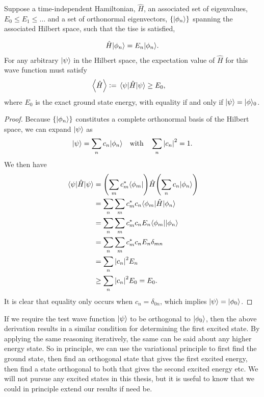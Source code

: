 \documentclass[Thesis.tex]{subfiles}
\begin{document}
\begin{theorem}\label{thm:variational-principle}
    Suppose a time-independent Hamiltonian, $\hat H$, an associated set of eigenvalues,
    $E_0\leq E_1\leq\dots$ and
    a set of orthonormal eigenvectors, $\{| \phi_n \rangle\}$ spanning the associated
    Hilbert space, such that the \gls{tise} is satisfied,

    \begin{align}
        \hat H| \phi_n \rangle = E_n| \phi_n \rangle.
    \end{align}
    For any arbitrary $| \psi \rangle$ in the Hilbert space, the expectation value of $\hat H$
    for this wave function must satisfy
    \begin{align}
        \expval{\hat H}&\vcentcolon= \expval{\hat H}{\psi} \geq E_0,
    \end{align}
    where $E_0$ is the exact ground state energy, with equality if and only if
    $| \psi \rangle=| \phi \rangle_0$.
\end{theorem}
\begin{proof}
    Because $\{| \phi_n \rangle\}$ constitutes a complete orthonormal basis of the Hilbert
    space, we can expand $| \psi \rangle$ as
    \begin{align}
        \ket\psi = \sum_n c_n\ket{\phi_n} \qq{with} \sum_n \abs{c_n}^2 = 1.
    \end{align}
    We then have
    \begin{align}
        \expval{\hat H}{\psi} &= \qty(\sum_m c^*_m\langle \phi_m |)\hat H\qty(\sum_n
        c_n| \phi_n \rangle)\\
        &= \sum_n\sum_m c_m^*c_n\langle \phi_m |\hat H| \phi_n \rangle\\
        &= \sum_n\sum_m c_m^*c_nE_n\langle \phi_m || \phi_n \rangle\\
        &= \sum_n\sum_m c_m^*c_nE_n\delta_{mn}\\
        &= \sum_n \abs{c_n}^2 E_n\\
        &\geq\sum_n \abs{c_n}^2 E_0 = E_0.
    \end{align}
    It is clear that equality only occurs when $c_n = \delta_{0n}$, which implies
    $| \psi \rangle=| \phi_0 \rangle$.
\end{proof}

If we require the test wave function $| \psi \rangle$ to be orthogonal to $| \phi_0 \rangle$, then
the above derivation results in a similar condition for determining the first excited
state. By applying the same reasoning iteratively, the same can be said about any higher
energy state. So in principle, we can use the variational principle to first find the
ground state, then find an orthogonal state that gives the first excited energy, then find
a state orthogonal to both that gives the second excited energy etc. We will not pursue
any excited states in this thesis, but it is useful to know that we could in principle
extend our results if need be.
\end{document}
